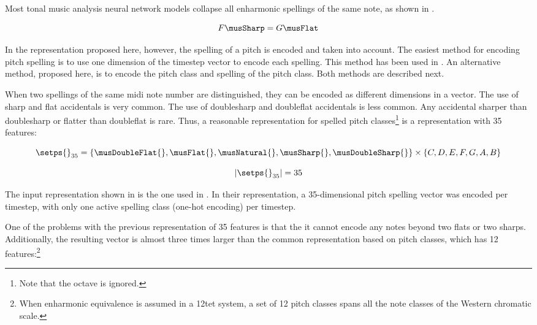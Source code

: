
Most tonal music analysis neural network models collapse all
enharmonic spellings of the same note, as shown in
.

\begin{equation}
    \label{eq:enharmonicity}
    F\musSharp = G\musFlat
\end{equation}

In the representation proposed here, however, the spelling
of a pitch is encoded and taken into account. The easiest
method for encoding pitch spelling is to use one dimension
of the timestep vector to encode each spelling. This method
has been used in \textcite{micchi2020not, micchi2021deep}.
An alternative method, proposed here, is to encode the pitch
class and spelling of the pitch class. Both methods are
described next.


When two spellings of the same \gls{midi} note number are
distinguished, they can be encoded as different dimensions
in a vector. The use of \gls{sharp} and \gls{flat}
accidentals is very common. The use of \gls{doublesharp} and
\gls{doubleflat} accidentals is less common. Any accidental
sharper than \gls{doublesharp} or flatter than
\gls{doubleflat} is rare. Thus, a reasonable representation
for spelled pitch classes\footnote{Note that the octave is
ignored.} is a representation with 35 features:

\begin{equation}
    \label{eq:pitch_spelling_35}
    \setps{}_{35} = \{\musDoubleFlat{}, \musFlat{}, 
    \musNatural{}, \musSharp{}, \musDoubleSharp{} \}
    \times 
    \{C, D, E, F, G, A, B \}
\end{equation}

\begin{equation}
    \label{eq:pitch_spelling_35_magnitude}
    | \setps{}_{35} | = 35
\end{equation}

The input representation shown in 
is the one used in \textcite{micchi2020not, micchi2021deep}.
In their representation, a 35-dimensional pitch spelling
vector was encoded per timestep, with only one active
spelling class (one-hot encoding) per timestep.


One of the problems with the previous representation of 35
features is that the it cannot encode any notes beyond two
flats or two sharps. Additionally, the resulting vector is
almost three times larger than the common representation
based on pitch classes, which has 12 features:\footnote{When
enharmonic equivalence is assumed in a \gls{12tet} system, a
set of 12 pitch classes spans all the note classes of the
Western chromatic scale.}


